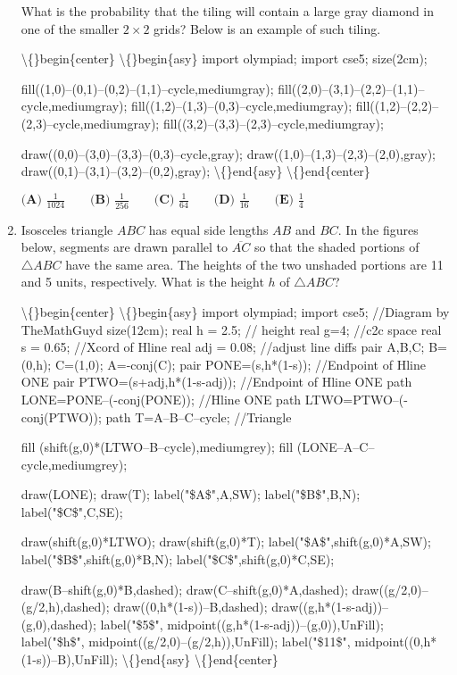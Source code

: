 \documentclass{article}
\begin{document}
\begin{enumerate}[label=\arabic*., itemsep=0.5em]
What is the probability that the tiling will contain a large gray diamond in one of the smaller \(2 \times 2\) grids? Below is an example of such tiling. 

\textbackslash\{\}begin\{center\}
\textbackslash\{\}begin\{asy\}
import olympiad;
import cse5;
size(2cm);

fill((1,0)--(0,1)--(0,2)--(1,1)--cycle,mediumgray);
fill((2,0)--(3,1)--(2,2)--(1,1)--cycle,mediumgray);
fill((1,2)--(1,3)--(0,3)--cycle,mediumgray);
fill((1,2)--(2,2)--(2,3)--cycle,mediumgray);
fill((3,2)--(3,3)--(2,3)--cycle,mediumgray);

draw((0,0)--(3,0)--(3,3)--(0,3)--cycle,gray);
draw((1,0)--(1,3)--(2,3)--(2,0),gray);
draw((0,1)--(3,1)--(3,2)--(0,2),gray);
\textbackslash\{\}end\{asy\}
\textbackslash\{\}end\{center\}


\(\textbf{(A) } \frac{1}{1024} \qquad \textbf{(B) } \frac{1}{256} \qquad \textbf{(C) } \frac{1}{64} \qquad \textbf{(D) } \frac{1}{16} \qquad \textbf{(E) } \frac{1}{4}\)\par \vspace{0.5em}\item Isosceles triangle \(ABC\) has equal side lengths \(AB\) and \(BC\). In the figures below, segments are drawn parallel to \(\overline{AC}\) so that the shaded portions of \(\triangle ABC\) have the same area. The heights of the two unshaded portions are 11 and 5 units, respectively. What is the height \(h\) of \(\triangle ABC\)?


\textbackslash\{\}begin\{center\}
\textbackslash\{\}begin\{asy\}
import olympiad;
import cse5;
//Diagram by TheMathGuyd
size(12cm);
real h = 2.5; // height
real g=4; //c2c space
real s = 0.65; //Xcord of Hline
real adj = 0.08; //adjust line diffs
pair A,B,C;
B=(0,h);
C=(1,0);
A=-conj(C);
pair PONE=(s,h*(1-s)); //Endpoint of Hline ONE
pair PTWO=(s+adj,h*(1-s-adj)); //Endpoint of Hline ONE
path LONE=PONE--(-conj(PONE)); //Hline ONE
path LTWO=PTWO--(-conj(PTWO));
path T=A--B--C--cycle; //Triangle


fill (shift(g,0)*(LTWO--B--cycle),mediumgrey);
fill (LONE--A--C--cycle,mediumgrey);

draw(LONE);
draw(T);
label("\$A\$",A,SW);
label("\$B\$",B,N);
label("\$C\$",C,SE);

draw(shift(g,0)*LTWO);
draw(shift(g,0)*T);
label("\$A\$",shift(g,0)*A,SW);
label("\$B\$",shift(g,0)*B,N);
label("\$C\$",shift(g,0)*C,SE);

draw(B--shift(g,0)*B,dashed);
draw(C--shift(g,0)*A,dashed);
draw((g/2,0)--(g/2,h),dashed);
draw((0,h*(1-s))--B,dashed);
draw((g,h*(1-s-adj))--(g,0),dashed);
label("\$5\$", midpoint((g,h*(1-s-adj))--(g,0)),UnFill);
label("\$h\$", midpoint((g/2,0)--(g/2,h)),UnFill);
label("\$11\$", midpoint((0,h*(1-s))--B),UnFill);
\textbackslash\{\}end\{asy\}
\textbackslash\{\}end\{center\}



\end{enumerate}
\end{document}
